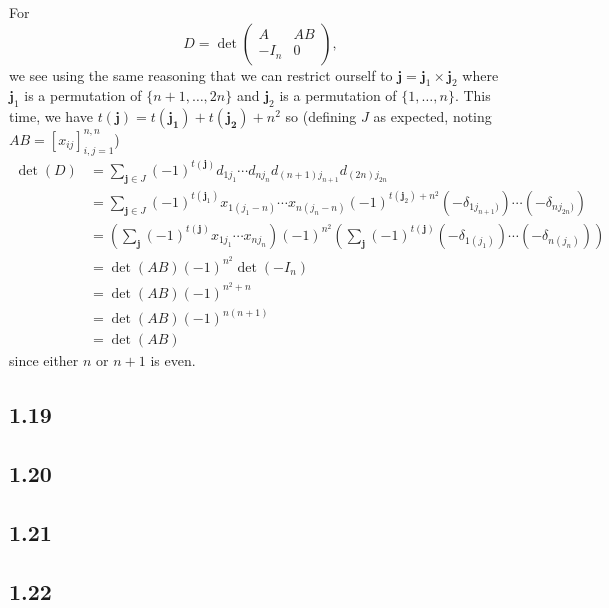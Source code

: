 \begin{solution}
  For
  \[
    D = \det\begin{pmatrix}
      A & AB\\
      -I_n & 0
    \end{pmatrix},
  \]
  we see using the same reasoning that we can restrict ourself to
  $\mathbf{j} = \mathbf{j}_1 \times \mathbf{j}_2$
  where $\mathbf{j}_1$ is a permutation of $\{n+1, \ldots, 2n\}$
  and $\mathbf{j}_2$ is a permutation of $\{1, \ldots, n\}$.
  This time, we have $t(\mathbf{j}) = t(\mathbf{j_1}) + t(\mathbf{j_2}) + n^2$ so
  (defining $J$ as expected, noting $AB = [x_{ij}]_{i,j=1}^{n,n}$)
  \begin{align*}
    \det(D)
    & = \sum_{\mathbf{j} \in J} (-1)^{t(\mathbf{j})} d_{1j_1} \cdots d_{nj_n} d_{(n+1)j_{n+1}} d_{(2n)j_{2n}}\\
    & = \sum_{\mathbf{j} \in J} (-1)^{t(\mathbf{j}_1)} x_{1(j_1-n)} \cdots x_{n(j_n-n)} (-1)^{t(\mathbf{j}_2)+n^2} (-\delta_{1j_{n+1})}) \cdots (-\delta_{nj_{2n})})\\
    & = \left(\sum_{\mathbf{j}} (-1)^{t(\mathbf{j})} x_{1j_1} \cdots x_{nj_n}\right)
    (-1)^{n^2}\left(\sum_{\mathbf{j}} (-1)^{t(\mathbf{j})} (-\delta_{1(j_1)}) \cdots (-\delta_{n(j_n)})\right)\\
    & = \det(AB) (-1)^{n^2}\det(-I_n)\\
    & = \det(AB) (-1)^{n^2+n}\\
    & = \det(AB) (-1)^{n(n+1)}\\
    & = \det(AB)
  \end{align*}
  since either $n$ or $n+1$ is even.
\end{solution}

\subsection*{1.19}
\nosolution

\subsection*{1.20}
\nosolution

\subsection*{1.21}
\nosolution

\subsection*{1.22}
\nosolution

